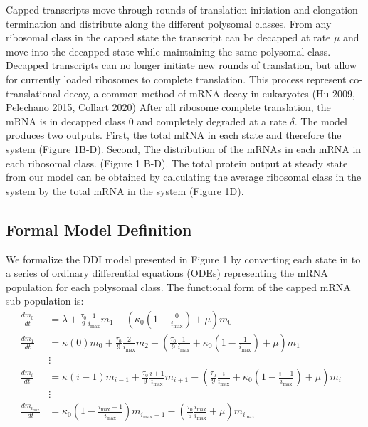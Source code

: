 \documentclass[review]{elsarticle}
\newcommand{\imax}{\ensuremath{i_{\max}}\xspace}
\begin{document}
Capped transcripts move through rounds of translation initiation and elongation-termination and distribute along the different polysomal classes. 
From any ribosomal class in the capped state the transcript can be decapped at rate $\mu$  and move into the decapped state while maintaining the same polysomal class.
Decapped transcripts can no longer initiate new rounds of translation, but allow for currently loaded ribosomes to complete translation. 
This process represent co-translational decay, a common method of mRNA decay in eukaryotes (Hu 2009, Pelechano 2015, Collart 2020) 
After all ribosome complete translation, the mRNA is in decapped class 0 and completely degraded at a rate $\delta$.
The model produces two outputs. 
First, the total mRNA in each state and therefore the system (Figure 1B-D). 
Second, The distribution of the mRNAs in each mRNA in each ribosomal class. (Figure 1 B-D).
The total protein output at steady state from our model can be obtained by calculating the average ribosomal class in the system by the total mRNA in the system (Figure 1D). 

\subsection{Formal Model Definition}
We formalize the DDI model presented in Figure 1 by converting each state in to a series of ordinary differential equations (ODEs) representing the mRNA population for each polysomal class. 
The functional form of the capped mRNA sub population is:
\begin{align} \label{eq:Capped_ODE}
\frac{dm_{0}}{dt} &= \lambda+\frac{\tau_0}{9}\frac{1}{\imax}m_{1}-\left(\kappa_0\left(1-\frac{0}{\imax}\right) + \mu\right)m_{0} \\ \nonumber
\frac{dm_{1}}{dt} &= \kappa(0)m_{0}+\frac{\tau_0}{9}\frac{2}{\imax}m_{2}-\left(\frac{\tau_0}{9}\frac{1}{\imax}+\kappa_0\left(1-\frac{1}{\imax}\right)+\mu\right) m_{1}\\ \nonumber
& \vdots & \\ \nonumber
\frac{dm_{i}}{dt} &= \kappa(i-1)m_{i-1}+\frac{\tau_0}{9}\frac{i+1}{\imax}m_{i+1}-\left(\frac{\tau_0}{9}\frac{i}{\imax}+\kappa_0\left(1-\frac{i-1}{\imax}\right)+\mu\right) m_{i} \\ \nonumber
& \vdots & \\ \nonumber
\frac{dm_{\imax}}{dt} &= \kappa_0\left(1-\frac{\imax-1}{\imax}\right)m_{\imax-1}-\left(\frac{\tau_0}{9}\frac{\imax}{\imax}+\mu\right) m_{\imax}\\ \nonumber
\end{align}
\end{document}
